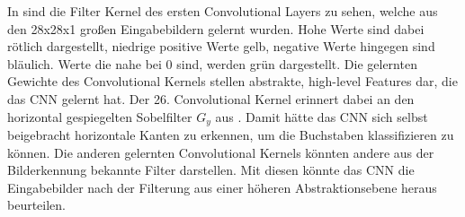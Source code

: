 \documentclass[runningheads,a4paper]{llncs}[2015/06/24]
\begin{document}
In  sind die Filter Kernel des ersten Convolutional Layers zu sehen, welche aus den 28x28x1 großen Eingabebildern gelernt wurden. Hohe Werte sind dabei rötlich dargestellt, niedrige positive Werte gelb, negative Werte hingegen sind bläulich. Werte die nahe bei 0 sind, werden grün dargestellt. Die gelernten Gewichte des Convolutional Kernels stellen abstrakte, high-level Features dar, die das CNN gelernt hat. Der 26. Convolutional Kernel erinnert dabei an den horizontal gespiegelten Sobelfilter $G_y$ aus . Damit hätte das CNN sich selbst beigebracht horizontale Kanten zu erkennen, um die Buchstaben klassifizieren zu können. Die anderen gelernten Convolutional Kernels könnten andere aus der Bilderkennung bekannte Filter darstellen. Mit diesen könnte das CNN die Eingabebilder nach der Filterung aus einer höheren Abstraktionsebene heraus beurteilen.
\end{document}
